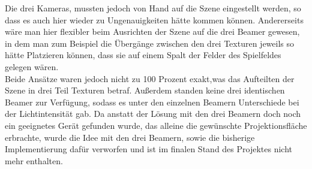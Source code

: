 Die drei Kameras, mussten jedoch von Hand auf die Szene eingestellt werden, so dass es auch hier wieder zu Ungenauigkeiten hätte kommen können. Andererseits wäre man hier flexibler beim Ausrichten der Szene auf die drei Beamer gewesen, in dem man zum Beispiel die Übergänge zwischen den drei Texturen jeweils so hätte Platzieren können, dass sie auf einem Spalt der Felder des Spielfeldes gelegen wären.\\ 
Beide Ansätze waren jedoch nicht zu 100 Prozent exakt,was das Aufteilten der Szene in drei Teil Texturen betraf. Außerdem standen keine drei identischen Beamer zur Verfügung, sodass es unter den einzelnen Beamern Unterschiede bei der Lichtintensität gab.
Da anstatt der Lösung mit den drei Beamern doch noch ein geeignetes Gerät gefunden wurde, das alleine die gewünschte Projektionsfläche erbrachte, wurde die Idee mit den drei Beamern, sowie die bisherige Implementierung dafür verworfen und ist im finalen Stand des Projektes nicht mehr enthalten.\\